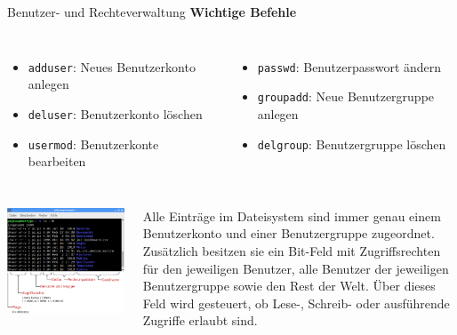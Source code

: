 {\begin{frame}[allowframebreaks]{Benutzer- und Rechteverwaltung}
    \medskip
    \textbf{Wichtige Befehle}
    \begin{columns}[T, onlytextwidth]
        \begin{itemize}
            \item \texttt{adduser}: Neues Benutzerkonto anlegen
            \item \texttt{deluser}: Benutzerkonto löschen
            \item \texttt{usermod}: Benutzerkonte bearbeiten
        \end{itemize}

        \begin{itemize}
            \item \texttt{passwd}: Benutzerpasswort ändern
            \item \texttt{groupadd}: Neue Benutzergruppe anlegen
            \item \texttt{delgroup}: Benutzergruppe löschen
        \end{itemize}
    \end{columns}

    \framebreak

    \begin{columns}[onlytextwidth]
        \includegraphics[width=\textwidth]{8-linux/img/rechte-dateizugriff}

        \parbox{\linewidth}{
            Alle Einträge im Dateisystem sind immer genau einem Benutzerkonto
            und einer Benutzergruppe zugeordnet. Zusätzlich besitzen sie ein
            Bit-Feld mit Zugriffsrechten für den jeweiligen Benutzer, alle
            Benutzer der jeweiligen Benutzergruppe sowie den Rest der Welt.
            Über dieses Feld wird gesteuert, ob Lese-, Schreib- oder ausführende
            Zugriffe erlaubt sind.

}
\end{columns}
\end{frame}}
